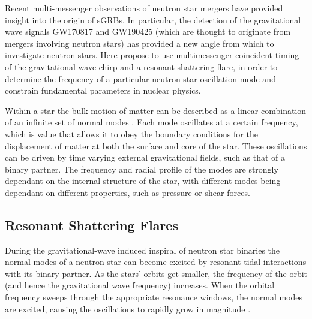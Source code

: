 \documentclass[fleqn,usenatbib]{mnras}
\begin{document}
\hspace{\parindent}Recent multi-messenger observations of neutron star mergers have provided insight into the origin of sGRBs. In particular, the detection of the gravitational wave signals GW170817 \citet{abbott2017merger} and GW190425 \citet{abbott2020gw190425} (which are thought to originate from mergers involving neutron stars) has provided a new angle from which to investigate neutron stars. Here propose to use multimessenger coincident timing of the gravitational-wave chirp and a resonant shattering flare, in order to determine the frequency of a particular neutron star oscillation mode and constrain fundamental parameters in nuclear physics.

\hspace{\parindent}Within a star the bulk motion of matter can be described as a linear combination of an infinite set of normal modes \citet{smeyers2011linear}. Each mode oscillates at a certain frequency, which is value that allows it to obey the boundary conditions for the displacement of matter at both the surface and core of the star. These oscillations can be driven by time varying external gravitational fields, such as that of a binary partner. The frequency and radial profile of the modes are strongly dependant on the internal structure of the star, with different modes being dependant on different properties, such as pressure or shear forces.%





\subsection{Resonant Shattering Flares}
\hspace{\parindent}During the gravitational-wave induced inspiral of neutron star binaries the normal modes of a neutron star can become excited by resonant tidal interactions with its binary partner. As the stars' orbits get smaller, the frequency of the orbit (and hence the gravitational wave frequency) increases. When the orbital frequency sweeps through the appropriate resonance windows, the normal modes are excited, causing the oscillations to rapidly grow in magnitude \citep{tsang2012resonant, tsang2013shattering, lai1994resonant}.
\end{document}
